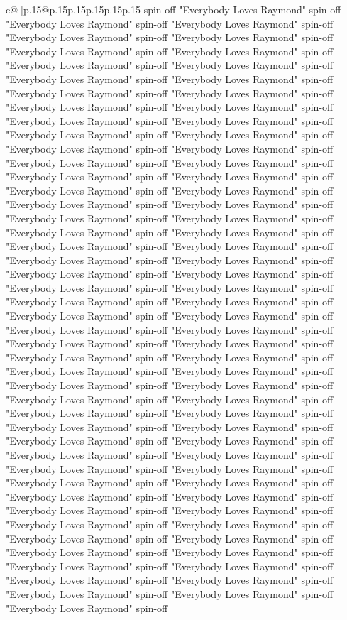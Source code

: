 \documentclass{article}
\begin{document}
{\begin{supertabular}{c@{$\;$}|p{.15\linewidth}@{}p{.15\linewidth}p{.15\linewidth}p{.15\linewidth}p{.15\linewidth}p{.15\linewidth}}
{{{spin{-}off "Everybody Loves Raymond" spin{-}off "Everybody Loves Raymond" spin{-}off "Everybody Loves Raymond" spin{-}off "Everybody Loves Raymond" spin{-}off "Everybody Loves Raymond" spin{-}off "Everybody Loves Raymond" spin{-}off "Everybody Loves Raymond" spin{-}off "Everybody Loves Raymond" spin{-}off "Everybody Loves Raymond" spin{-}off "Everybody Loves Raymond" spin{-}off "Everybody Loves Raymond" spin{-}off "Everybody Loves Raymond" spin{-}off "Everybody Loves Raymond" spin{-}off "Everybody Loves Raymond" spin{-}off "Everybody Loves Raymond" spin{-}off "Everybody Loves Raymond" spin{-}off "Everybody Loves Raymond" spin{-}off "Everybody Loves Raymond" spin{-}off "Everybody Loves Raymond" spin{-}off "Everybody Loves Raymond" spin{-}off "Everybody Loves Raymond" spin{-}off "Everybody Loves Raymond" spin{-}off "Everybody Loves Raymond" spin{-}off "Everybody Loves Raymond" spin{-}off "Everybody Loves Raymond" spin{-}off "Everybody Loves Raymond" spin{-}off "Everybody Loves Raymond" spin{-}off "Everybody Loves Raymond" spin{-}off "Everybody Loves Raymond" spin{-}off "Everybody Loves Raymond" spin{-}off "Everybody Loves Raymond" spin{-}off "Everybody Loves Raymond" spin{-}off "Everybody Loves Raymond" spin{-}off "Everybody Loves Raymond" spin{-}off "Everybody Loves Raymond" spin{-}off "Everybody Loves Raymond" spin{-}off "Everybody Loves Raymond" spin{-}off "Everybody Loves Raymond" spin{-}off "Everybody Loves Raymond" spin{-}off "Everybody Loves Raymond" spin{-}off "Everybody Loves Raymond" spin{-}off "Everybody Loves Raymond" spin{-}off "Everybody Loves Raymond" spin{-}off "Everybody Loves Raymond" spin{-}off "Everybody Loves Raymond" spin{-}off "Everybody Loves Raymond" spin{-}off "Everybody Loves Raymond" spin{-}off "Everybody Loves Raymond" spin{-}off "Everybody Loves Raymond" spin{-}off "Everybody Loves Raymond" spin{-}off "Everybody Loves Raymond" spin{-}off "Everybody Loves Raymond" spin{-}off "Everybody Loves Raymond" spin{-}off "Everybody Loves Raymond" spin{-}off "Everybody Loves Raymond" spin{-}off "Everybody Loves Raymond" spin{-}off "Everybody Loves Raymond" spin{-}off "Everybody Loves Raymond" spin{-}off "Everybody Loves Raymond" spin{-}off "Everybody Loves Raymond" spin{-}off "Everybody Loves Raymond" spin{-}off "Everybody Loves Raymond" spin{-}off "Everybody Loves Raymond" spin{-}off "Everybody Loves Raymond" spin{-}off "Everybody Loves Raymond" spin{-}off "Everybody Loves Raymond" spin{-}off "Everybody Loves Raymond" spin{-}off "Everybody Loves Raymond" spin{-}off "Everybody Loves Raymond" spin{-}off "Everybody Loves Raymond" spin{-}off "Everybody Loves Raymond" spin{-}off "Everybody Loves Raymond" spin{-}off "Everybody Loves Raymond" spin{-}off "Everybody Loves Raymond" spin{-}off "Everybody Loves Raymond" spin{-}off "Everybody Loves Raymond" spin{-}off "Everybody Loves Raymond" spin{-}off "Everybody Loves Raymond" spin{-}off "Everybody Loves Raymond" spin{-}off "Everybody Loves Raymond" spin{-}off "Everybody Loves Raymond" spin{-}off "Everybody Loves Raymond" spin{-}off "Everybody Loves Raymond" spin{-}off "Everybody Loves Raymond" spin{-}off "Everybody Loves Raymond" spin{-}off "Everybody Loves Raymond" spin{-}off }}}
\end{supertabular}}
\end{document}

